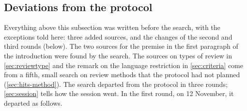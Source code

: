 \subsection{Deviations from the protocol}\label{sec:deviations}

Everything above this subsection was written before the search, with
the exceptions told here: three added sources, and the changes of the
second and third rounds (below).
The two sources for the premise in the first paragraph of the
introduction were found by the search.
The sources on types of review in \cref{sec:reviewtype} and the remark
on the language restriction in \cref{sec:criteria} come from a fifth,
small search on review methods that the protocol had not planned
(\cref{sec:hits-method}).
The search departed from the protocol in three rounds;
\cref{sec:session} tells how the session went.
In the first round, on 12 November, it departed as follows.
